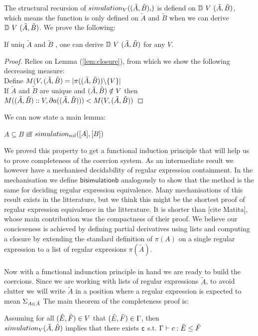 \documentclass[a4paper,UKenglish,cleveref, autoref, thm-restate]{lipics-v2021}
\newcommand\mycomment[1]{}
\begin{document}
The structural recursion of $\simulationb{V}{\pder{A}{B}}$ is defiend on $\mathbb{D}~{V}~(\tilde{A},\tilde{B})$, which means the function is only defined on $\tilde{A}$ and $\tilde{B}$ when we can derive $\mathbb{D}~{V}~(\tilde{A},\tilde{B})$. We prove the following:
\begin{lemma}
If uniq $\tilde{A}$ and $\tilde{B}$ , one can derive $\mathbb{D}~{V}~(\tilde{A},\tilde{B})$ for any $V$.
\end{lemma}
\begin{proof}
Relies on Lemma (\ref{lem:closure}), from which we show the following decreasing measure:\\
Define $M(V,(\tilde{A},\tilde{B}) = |\pi((\tilde{A},\tilde{B})) \backslash \{V\}|  $ \mycomment{using set notation for lists}\\
If $\tilde{A}$ and $\tilde{B}$ are unique and $(\tilde{A},\tilde{B}) \notin V$ then $M((\tilde{A},\tilde{B})::V,\partial{a}((\tilde{A},\tilde{B}))) <  M(V,(\tilde{A},\tilde{B})) $
\end{proof}
\mycomment{We use a similar measure in ITP 2023 projection}
We can now state a main lemma:
\begin{lemma}
$A \subseteq B$ iff $\simulationb{nil}{[A]}{[B]}$
\end{lemma}
We proved this property to get a functional induction principle that will help us to prove completeness of the coercion system. As an intermediate result we however have a mechanised decidability of regular expression containment. In the mechanisation we define $\mathsf{bisimulationb}$ analogously to show that the method is the same for deciding regular expression equivalence. Many mechanisations of this result exists in the litterature, but we think this might be the shortest proof of regular expression equivalence in the litterature. It is shorter than [cite Matita], whose main contribution was the compactness of their proof. We believe our concicseness is achieved by defining partial derivatives using lists and computing a closure by extending the standard definition of $\pi(A)$ on a single regular expression to a list of regular expresions $\pi(\tilde{A})$.\\\\
Now with a functional indunction principle in hand we are ready to build the coercions. Since we are working with lists of regular expressions $\tilde{A}$, to avoid clutter we will write $\tilde{A}$ in a position where a regular expression is expected to mean $\Sigma_{A \in \tilde{A}}$ The main theorem of the completeness proof is:
\begin{theorem}
Assuming for all $(\tilde{E},\tilde{F}) \in V$ that $(\tilde{E},\tilde{F}) \in \Gamma$, then\\
$\simulationb{V}{\tilde{A}}{\tilde{B}}$ implies that there exists $\textsf{c}$ s.t. $\contains{\Gamma}{c}{\tilde{E}}{\tilde{F}}$
\end{theorem}
\end{document}
